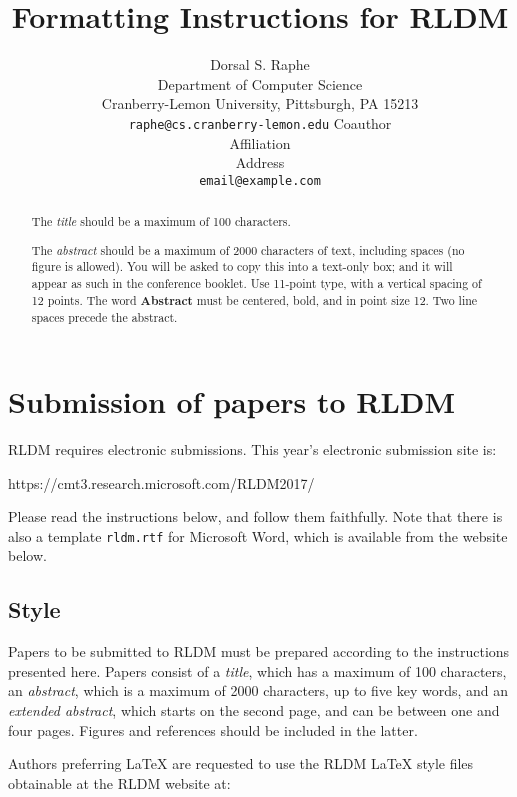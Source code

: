 \documentclass[11pt]{article}
\title{Formatting Instructions for RLDM}
\author{
  Dorsal S. Raphe %
      \\       Department of Computer Science %
      \\         Cranberry-Lemon University, Pittsburgh, PA
15213 %
                  \\ \texttt{raphe@cs.cranberry-lemon.edu} %
        \And
    Coauthor %
      \\       Affiliation %
      \\         Address %
                  \\ \texttt{email@example.com} %
        \And
  }
\begin{document}
\maketitle

\begin{abstract}
The \emph{title} should be a maximum of 100 characters.

The \emph{abstract} should be a maximum of 2000 characters of text,
including spaces (no figure is allowed). You will be asked to copy this
into a text-only box; and it will appear as such in the conference
booklet. Use 11-point type, with a vertical spacing of 12 points. The
word \textbf{Abstract} must be centered, bold, and in point size 12. Two
line spaces precede the abstract.
\end{abstract}


\newpage

\section{Submission of papers to
RLDM}\label{submission-of-papers-to-rldm}

RLDM requires electronic submissions. This year's electronic submission
site is:

\begin{center}
   https://cmt3.research.microsoft.com/RLDM2017/
\end{center}

Please read the instructions below, and follow them faithfully. Note
that there is also a template \texttt{rldm.rtf} for Microsoft Word,
which is available from the website below.

\subsection{Style}\label{style}

Papers to be submitted to RLDM must be prepared according to the
instructions presented here. Papers consist of a \emph{title}, which has
a maximum of 100 characters, an \emph{abstract}, which is a maximum of
2000 characters, up to five key words, and an \emph{extended abstract},
which starts on the second page, and can be between one and four pages.
Figures and references should be included in the latter.

Authors preferring \LaTeX{} are requested to use the RLDM \LaTeX{} style
files obtainable at the RLDM website at:
\end{document}
